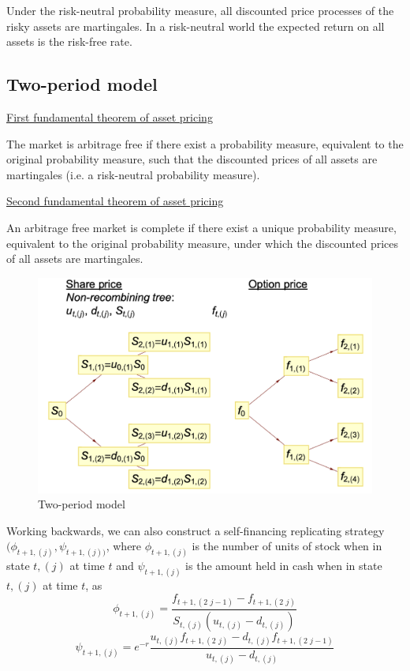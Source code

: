 \documentclass[11pt,a4paper]{book}
\theoremstyle{definition}\newtheorem{definition}{Definition}
\theoremstyle{definition}\newtheorem{fact}{Fact}
\theoremstyle{definition}\newtheorem{remark}{Remark}
\theoremstyle{definition}\newtheorem{ex}{Ex.}
\theoremstyle{definition}\newtheorem{project}{Project}
\theoremstyle{definition}\newtheorem{problem}{Problem}
\theoremstyle{definition}\newtheorem{example}{Example}
\numberwithin{theorem}{section}
\numberwithin{corollary}{chapter}
\numberwithin{assumption}{chapter}
\numberwithin{definition}{chapter}
\numberwithin{prop}{chapter}
\numberwithin{notation}{chapter}
\numberwithin{problem}{chapter}
\numberwithin{example}{chapter}
\numberwithin{fact}{chapter}
\numberwithin{ex}{chapter}
\begin{document}
Under the risk-neutral probability measure, all discounted price processes of the risky assets are martingales. In a risk-neutral world the expected return on all assets is the risk-free rate.

\subsection{Two-period model}

\underline{First fundamental theorem of asset pricing}

The market is arbitrage free if there exist a probability measure, equivalent to the original probability measure, such that the discounted prices of all assets are martingales (i.e. a risk-neutral probability measure).

\underline{Second fundamental theorem of asset pricing}

An arbitrage free market is complete if there exist a unique probability measure, equivalent to the original probability measure, under which the discounted prices of all assets are martingales.

\begin{figure}[H]
	\centering
	\includegraphics[scale=0.5]{Chapter 4/Chapter4_2.png}
	\caption{Two-period model}
\end{figure}

Working backwards, we can also construct a self-financing replicating strategy $(\phi_{t+1,(j)} , \psi_{t+1,(j))}$, where $\phi_{t+1,(j)}$ is the number of units of stock when in state $t,(j)$ at time $t$ and $\psi_{t+1,(j)}$ is the amount held in cash when in state $t,(j)$ at time $t$, as
$$ \phi_{t+1,(j)} = \frac{f_{t+1,(2\,\,j-1)}-f_{t+1,(2\,\,j)}}{S_{t,(j)} (u_{t,(j)}- d_{t,(j)})} $$
$$ \psi_{t+1,(j)} = e^{-r} \frac{u_{t,(j)}f_{t+1,(2\,\,j)} - d_{t,(j)}f_{t+1,(2\,\,j-1)}}{u_{t,(j)} - d_{t,(j)}} $$
\end{document}
